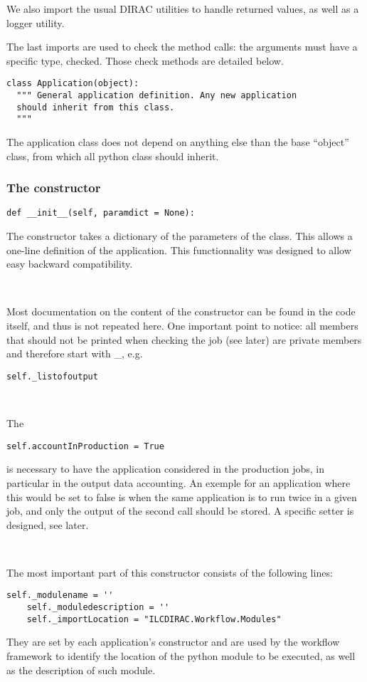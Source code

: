 \documentclass[a4paper,12pt]{article}
\begin{document}
We also import the usual DIRAC utilities to handle returned values, as well as a
logger utility.

The last imports are used to check the method calls: the arguments must have a
specific type, checked. Those check methods are detailed below.

\begin{lstlisting}[name=appli]
class Application(object):
  """ General application definition. Any new application 
  should inherit from this class.
  """
\end{lstlisting}
The application class does not depend on anything else than the base ``object''
class, from which all python class should inherit.

\subsubsection{The constructor}
\begin{lstlisting}[name=appli]
  def __init__(self, paramdict = None):
\end{lstlisting}
The constructor takes a dictionary of the parameters of the class. This allows a
one-line definition of the application. This functionnality was designed to
allow easy backward compatibility.

~

Most documentation on the content of the constructor can be found in the code
itself, and thus is not repeated here. One important point to notice: all members that 
should not be printed when checking the job (see later)
are private members and therefore start with \_, e.g. 
\begin{lstlisting}[firstnumber=53,belowskip=0.5cm]
    self._listofoutput
\end{lstlisting}

~

The 
\begin{lstlisting}[firstnumber=71]
    self.accountInProduction = True    
\end{lstlisting}
is necessary to have the application considered in the production jobs, in
particular in the output data accounting. An exemple for an application where
this would be set to false is when the same application is to run twice in a
given job, and only the output of the second call should be stored. A specific
setter is designed, see later.

~

The most important part of this constructor consists of the following lines:
\begin{lstlisting}[firstnumber=73]
    self._modulename = ''
    self._moduledescription = ''
    self._importLocation = "ILCDIRAC.Workflow.Modules" 
\end{lstlisting}
They are set by each application's constructor and are used by the workflow
framework to identify the location of the python module to be executed, as well
as the description of such module. 
\end{document}
